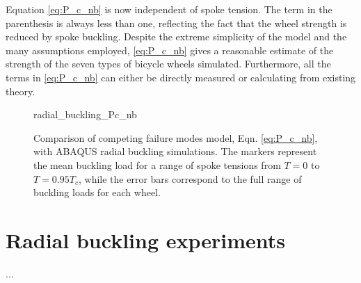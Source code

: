 \documentclass[\rootdir/thesis.tex]{subfiles}
\begin{document}
Equation \eqref{eq:P_c_nb} is now independent of spoke tension. The term in the parenthesis is always less than one, reflecting the fact that the wheel strength is reduced by spoke buckling. Despite the extreme simplicity of the model and the many assumptions employed, \eqref{eq:P_c_nb} gives a reasonable estimate of the strength of the seven types of bicycle wheels simulated. Furthermore, all the terms in \eqref{eq:P_c_nb} can either be directly measured or calculating from existing theory.

\begin{figure}[h]
\centering
{radial_buckling_Pc_nb}
\caption{Comparison of competing failure modes model, Eqn. \eqref{eq:P_c_nb}, with ABAQUS radial buckling simulations. The markers represent the mean buckling load for a range of spoke tensions from $T=0$ to $T=0.95T_c$, while the error bars correspond to the full range of buckling loads for each wheel.}
\end{figure}

\section{Radial buckling experiments}
...
\end{document}
